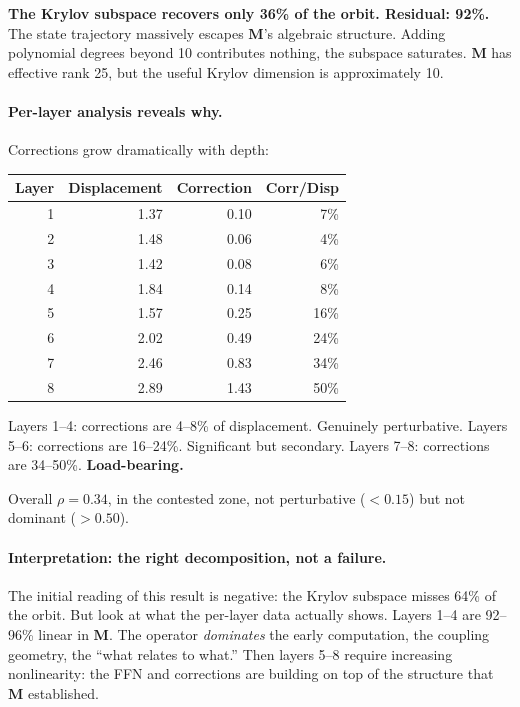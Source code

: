 \documentclass[11pt, a4paper]{article}
\newcommand{\M}{\mathbf{M}}
\theoremstyle{plain}
\theoremstyle{definition}
\theoremstyle{remark}
\begin{document}
\textbf{The Krylov subspace recovers only 36\% of the orbit. Residual: 92\%.}
The state trajectory massively escapes $\M$'s algebraic structure.
Adding polynomial degrees beyond 10 contributes nothing, the subspace saturates.
$\M$ has effective rank 25, but the useful Krylov dimension is approximately 10.

\paragraph{Per-layer analysis reveals why.}
Corrections grow dramatically with depth:

\begin{center}\small
\begin{tabular}{rrrr}
\toprule
\textbf{Layer} & \textbf{Displacement} & \textbf{Correction} & \textbf{Corr/Disp} \\
\midrule
1 & 1.37 & 0.10 & 7\% \\
2 & 1.48 & 0.06 & 4\% \\
3 & 1.42 & 0.08 & 6\% \\
4 & 1.84 & 0.14 & 8\% \\
5 & 1.57 & 0.25 & 16\% \\
6 & 2.02 & 0.49 & 24\% \\
7 & 2.46 & 0.83 & 34\% \\
8 & 2.89 & 1.43 & 50\% \\
\bottomrule
\end{tabular}
\end{center}

Layers 1--4: corrections are 4--8\% of displacement. Genuinely perturbative.
Layers 5--6: corrections are 16--24\%. Significant but secondary.
Layers 7--8: corrections are 34--50\%. \textbf{Load-bearing.}

Overall $\rho = 0.34$, in the contested zone, not perturbative ($< 0.15$) but not dominant ($> 0.50$).

\paragraph{Interpretation: the right decomposition, not a failure.}
The initial reading of this result is negative: the Krylov subspace misses 64\% of the orbit.
But look at what the per-layer data actually shows.
Layers 1--4 are 92--96\% linear in $\M$.
The operator \emph{dominates} the early computation, the coupling geometry, the ``what relates to what.''
Then layers 5--8 require increasing nonlinearity: the FFN and corrections are building on top of the structure that $\M$ established.
\end{document}
